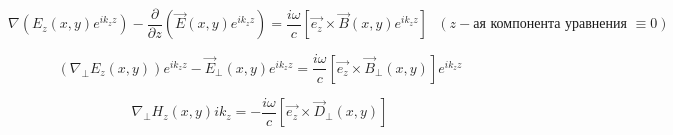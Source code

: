 \documentclass[12pt, a4paper]{report}
\begin{document}
\[ \nabla (E_z (x,y ) e^{ i k_z z } ) - \frac{\partial}{\partial z} (\vec{E } (x,y )e^{i k_z z} ) = \frac{i \omega }{c } [\vec{e_z} \times \vec{B } (x,y ) e^{ i k_z z} ]\text{  }  (z-\text{ая компонента уравнения } \equiv 0)  \] 

\[ (\nabla_{\perp } E_z (x,y ) ) e^{i k_z z} - \vec{E } _{ \perp } (x,y ) e^{i k_z z} =  \frac{i \omega }{c } [\vec{e_z} \times  \vec{B} _{ \perp } (x,y )   ] e^{ i k_z z}      \] 

\[ \nabla_{ \perp } H_z (x,y )  i k_z = - \frac{i \omega }{c } [\vec{e_z} \times  \vec{D} _{ \perp } (x,y )  ] \] 


\ifdefined\mainfile
\else
    
\end{document}
